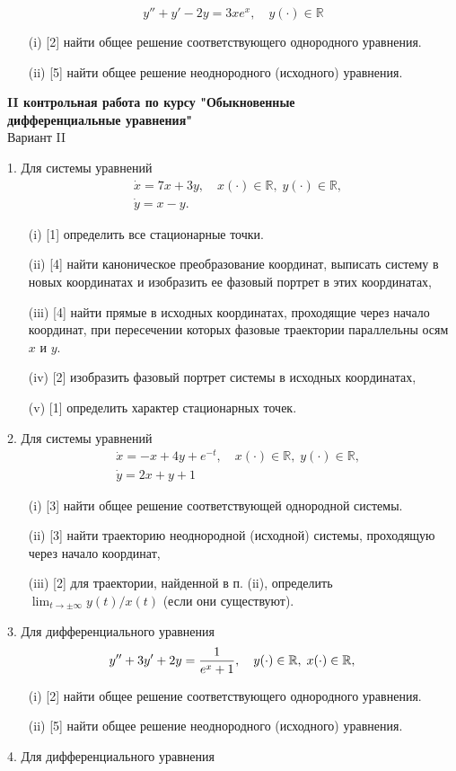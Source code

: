 \documentclass[a4paper, 12pt]{article}
\begin{document}
$$
y''+y'-2y=3xe^x, \quad y(\cdot) \in \mathbb{R}
$$
\begin{itemize}
\item [(i)][2]  найти общее решение соответствующего однородного уравнения.
\item [(ii)][5] найти общее решение неоднородного (исходного) уравнения.

\end{itemize}





\newpage
\begin{center}
\textbf{II контрольная работа по курсу "Обыкновенные \\
дифференциальные уравнения"
}\\
{Вариант II}
\end{center}
1. Для системы уравнений
$$
\begin{aligned}
&\dot{x}=7 x+3 y, \quad x(\cdot) \in \mathbb{R}, \; y(\cdot) \in \mathbb{R}, \\
&\dot{y}= x- y .
\end{aligned}
$$
\begin{itemize}
\item [(i)][1] определить все стационарные точки.
\item [(ii)][4] найти каноническое преобразование координат, выписать систему в новых координатах и изобразить ее фазовый портрет в этих координатах,
\item [(iii)][4] найти прямые в исходных координатах, проходящие через начало координат, при пересечении которых фазовые траектории параллельны осям $x$ и $y$.
\item [(iv)][2]  изобразить фазовый портрет системы в исходных координатах,
\item [(v)][1]  определить характер стационарных точек.
\end{itemize}
2. Для системы уравнений
$$
\begin{aligned}
&\dot{x}=-x+4y+e^{-t}, \quad x(\cdot) \in \mathbb{R},\; y(\cdot) \in \mathbb{R}, \\
&\dot{y}=2x+y+1
\end{aligned}
$$
\begin{itemize}
\item [(i)][3] найти общее решение соответствующей однородной системы.
\item [(ii)][3] найти траекторию неоднородной (исходной) системы, проходящую через начало координат,
\item [(iii)][2] для траектории, найденной в п. (ii), определить $\lim _{t \rightarrow \pm \infty} y(t) / x(t)$ (если они существуют).
\end{itemize}
3. Для дифференциального уравнения
$$
y''+3y'+2y=\frac {1}{e^x+1}, \quad y(\cdot) \in \mathbb{R},\; x(\cdot) \in \mathbb{R},\\
$$
\begin{itemize}
\item [(i)][2]  найти общее решение соответствующего однородного уравнения.
\item [(ii)][5]  найти общее решение неоднородного (исходного) уравнения.
\end{itemize}
4. Для дифференциального уравнения
\end{document}
